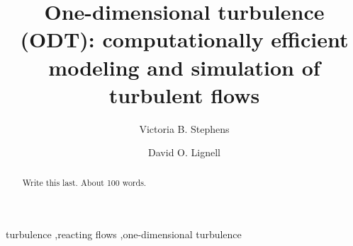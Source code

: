 \documentclass[preprint,12pt, a4paper]{elsarticle}
\begin{document}
\begin{frontmatter}



\title{One-dimensional turbulence (ODT): computationally efficient modeling and simulation of turbulent  flows}


\author{Victoria B. Stephens}
\author{David O. Lignell}


\address{Chemical Engineering Department, Brigham Young University, Provo, UT 84602, USA}

\begin{abstract}
Write this last. About 100 words. 
\end{abstract}

\begin{keyword}
turbulence \sep reacting flows \sep one-dimensional turbulence



\end{keyword}

\end{frontmatter}

\end{document}
